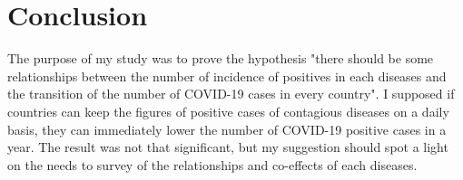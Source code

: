 \documentclass[12pt]{report}
\begin{document}
\chapter{Conclusion}
The purpose of my study was to prove the hypothesis "there should be some relationships between the number of incidence of positives in each diseases and the transition of the number of COVID-19 cases in every country".
I supposed if countries can keep the figures of positive cases of contagious diseases on a daily basis, they can immediately lower the number of COVID-19 positive cases in a year.
The result was not that significant, but my suggestion should spot a light on the needs to survey of the relationships and co-effects of each diseases.







%







\end{document}
